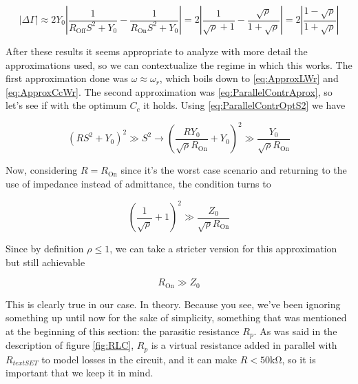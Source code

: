 \documentclass[../main.tex]{subfiles}
\begin{document}
\begin{equation}
\label{eq:OptimumParallelContr}
    |\Delta\Gamma| \approx 2Y_{0}\left|\frac{1}{
                   R_{\text{Off}}S^2 + Y_{0}} - \frac{1}{R_{\text{On}}S^2 + Y_{0}
               }\right|
                   = 2\left|
                   \frac{1}{\sqrt\rho + 1} - \frac{\sqrt\rho}{1 + \sqrt\rho}
                   \right|
                   = 2\left|
                   \frac{1 - \sqrt\rho}{1 + \sqrt\rho}
                   \right|
\end{equation}

After these results it seems appropriate to analyze with more detail the
approximations used, so we can contextualize the regime in which this works.
The first approximation done was \(\omega \approx \omega_{r}\), which boils
down to \ref{eq:ApproxLWr} and \ref{eq:ApproxCcWr}. The second approximation
was \ref{eq:ParallelContrAprox}, so let's see if with the optimum \(C_{c}\) it
holds. Using \ref{eq:ParallelContrOptS2} we have

\begin{equation}
    (RS^2 + Y_{0})^2 \gg S^2 \rightarrow
    \left(\frac{R Y_{0}}{\sqrt\rho R_{\text{On}}} + Y_{0}\right)^2 \gg
    \frac{Y_{0}}{\sqrt\rho R_{\text{On}}}
\end{equation}

Now, considering \(R = R_{\text{On}}\) since it's the worst case scenario and
returning to the use of impedance instead of admittance, the condition turns to

\begin{equation}
\label{eq:ProtoOptParallelContrApprox}
    \left(\frac{1}{\sqrt\rho} + 1\right)^2 \gg
    \frac{Z_{0}}{\sqrt\rho R_{\text{On}}}
\end{equation}

Since by definition \(\rho \leq 1\), we can take a stricter version for this
approximation but still achievable

\begin{equation}
\label{eq:OptParallelContrApprox}
    R_{\text{On}} \gg Z_{0}
\end{equation}

This is clearly true in our case. In theory. Because you see, we've been
ignoring something up until now for the sake of simplicity, something that was
mentioned at the beginning of this section: the parasitic resistance \(R_{p}\).
As was said in the description of figure \ref{fig:RLC}, \(R_{p}\) is a virtual
resistance added in parallel with \(R_{text{SET}}\) to model losses in the
circuit, and it can make \(R < 50\unit{\kilo\ohm}\), so it is important that
we keep it in mind.
\end{document}
